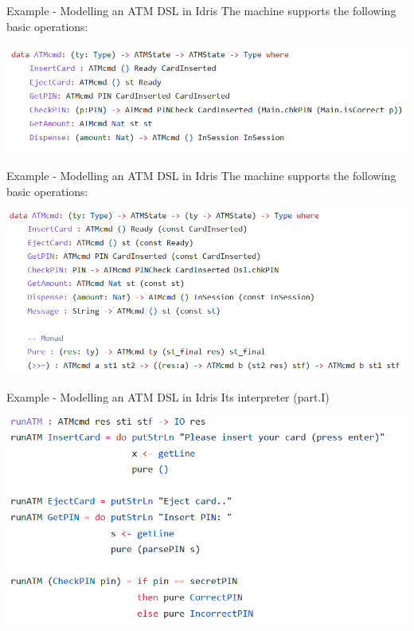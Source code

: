 \documentclass{beamer}
\newcommand{\dsltitle}{Example - Modelling an ATM DSL in Idris}
\begin{document}
\begin{frame}[fragile]{\dsltitle}
The machine supports the following basic operations:
\begin{center}
	\includegraphics[width=\textwidth]{dsl-code-2}
\end{center}
\end{frame}

\begin{frame}[fragile]{\dsltitle}
The machine supports the following basic operations:
\begin{center}
	\includegraphics[width=\textwidth]{dsl-code-3}
\end{center}
\end{frame}

\begin{frame}[fragile]{\dsltitle}
Its interpreter (part.I)
\begin{center}
	\includegraphics[width=\textwidth]{dsl-code-4_1}
\end{center}
\end{frame}
\end{document}
